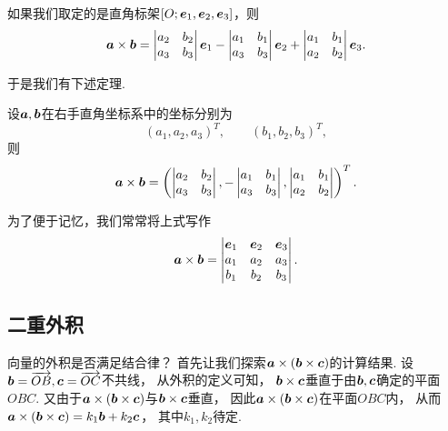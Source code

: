 如果我们取定的是直角标架\([O;\boldsymbol{e}_1,\boldsymbol{e}_2,\boldsymbol{e}_3]\)，则
\begin{equation}
	\boldsymbol{a}\times\boldsymbol{b}
	= \begin{vmatrix}
		a_2 & b_2 \\
		a_3 & b_3
	\end{vmatrix}
	\boldsymbol{e}_1
	- \begin{vmatrix}
		a_1 & b_1 \\
		a_3 & b_3
	\end{vmatrix}
	\boldsymbol{e}_2
	+ \begin{vmatrix}
		a_1 & b_1 \\
		a_2 & b_2
	\end{vmatrix}
	\boldsymbol{e}_3.
\end{equation}

于是我们有下述定理.
\begin{theorem}
设\(\boldsymbol{a},\boldsymbol{b}\)在右手直角坐标系中的坐标分别为\begin{equation*}
	(a_1,a_2,a_3)^T, \qquad
	(b_1,b_2,b_3)^T,
\end{equation*}
则
\begin{equation}
	\boldsymbol{a}\times\boldsymbol{b}
	= \left( \begin{vmatrix}
		a_2 & b_2 \\
		a_3 & b_3
	\end{vmatrix},
	- \begin{vmatrix}
		a_1 & b_1 \\
		a_3 & b_3
	\end{vmatrix},
	\begin{vmatrix}
		a_1 & b_1 \\
		a_2 & b_2
	\end{vmatrix} \right)^T.
\end{equation}
\end{theorem}
为了便于记忆，我们常常将上式写作\begin{equation}
	\boldsymbol{a}\times\boldsymbol{b}
	= \begin{vmatrix}
		\boldsymbol{e}_1 & \boldsymbol{e}_2 & \boldsymbol{e}_3 \\
		a_1 & a_2 & a_3 \\
		b_1 & b_2 & b_3
	\end{vmatrix}.
\end{equation}

\subsection{二重外积}
向量的外积是否满足结合律？
首先让我们探索\(\boldsymbol{a}\times(\boldsymbol{b}\times\boldsymbol{c})\)的计算结果.
设\(\boldsymbol{b}=\overrightarrow{OB},\boldsymbol{c}=\overrightarrow{OC}\)不共线，
从外积的定义可知，
\(\boldsymbol{b}\times\boldsymbol{c}\)垂直于由\(\boldsymbol{b},\boldsymbol{c}\)确定的平面\(OBC\).
又由于\(\boldsymbol{a}\times(\boldsymbol{b}\times\boldsymbol{c})\)与\(\boldsymbol{b}\times\boldsymbol{c}\)垂直，
因此\(\boldsymbol{a}\times(\boldsymbol{b}\times\boldsymbol{c})\)在平面\(OBC\)内，
从而\(\boldsymbol{a}\times(\boldsymbol{b}\times\boldsymbol{c}) = k_1 \boldsymbol{b} + k_2 \boldsymbol{c}\)，
其中\(k_1,k_2\)待定.

